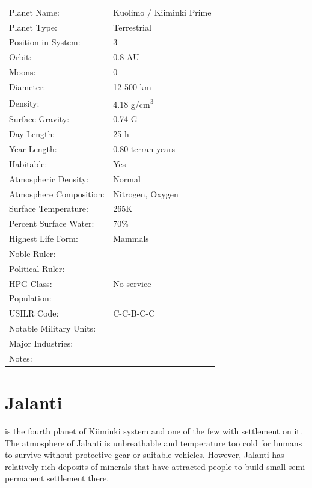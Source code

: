 \documentclass{tufte-book}
\begin{document}
\bigskip
\begin{minipage}{\textwidth}
\begin{center}
\begin{tabular}{ll}
\toprule
Planet Name: & Kuolimo / Kiiminki Prime \\
Planet Type: & Terrestrial \\
Position in System: & 3 \\
Orbit: & 0.8 AU \\
Moons: & 0 \\
Diameter: & 12 500 km \\
Density: & 4.18 g/cm\textsuperscript{3} \\
Surface Gravity: & 0.74 G \\
Day Length: & 25 h \\
Year Length: & 0.80 terran years \\
Habitable: & Yes \\
\quad Atmospheric Density: & Normal \\
\quad Atmosphere Composition: & Nitrogen, Oxygen \\
\quad Surface Temperature: & 265K \\
\quad Percent Surface Water: & 70\% \\
\quad Highest Life Form: & Mammals \\
\toprule
Noble Ruler: & \\
Political Ruler: & \\
HPG Class: & No service \\
Population: & \\
USILR Code: & C-C-B-C-C \\
Notable Military Units: & \\
Major Industries: & \\
Notes: & \\

\bottomrule
\end{tabular}
\end{center}
\end{minipage}

\section{Jalanti}

 is the fourth planet of Kiiminki system and one of
the few with settlement on it. The atmosphere of Jalanti is unbreathable
and temperature too cold for humans to survive without protective gear
or suitable vehicles. However, Jalanti has relatively rich deposits of
minerals that have attracted people to build small semi-permanent
settlement there. 
\end{document}
